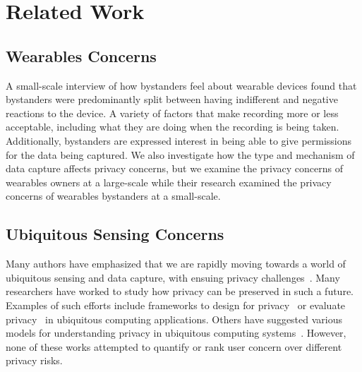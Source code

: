 
\section{Related Work}

\subsection{Wearables Concerns}
A small-scale interview of how bystanders feel about wearable devices \cite{denning2014situ} found that bystanders were predominantly split between having indifferent and negative reactions to the device. A variety of factors that make recording more or less acceptable, including what they are doing when the recording is being taken.  Additionally, bystanders are expressed interest in being able to give permissions for the data being captured. We also investigate how the type and mechanism of data capture affects privacy concerns, but we examine the privacy concerns of wearables owners at a large-scale while their research examined the privacy concerns of wearables bystanders at a small-scale. 

\subsection{Ubiquitous Sensing Concerns}
Many authors have emphasized that we are rapidly moving towards a world of ubiquitous sensing and data capture, with ensuing privacy challenges~\cite{abowd2000charting,palen2003unpacking,camp2000internet}. Many researchers have worked to study how privacy can be preserved in such a future. Examples of such efforts include frameworks to design for privacy~\cite{bellotti1993design,camp2003designing,langheinrich2001privacy} or evaluate privacy~\cite{scholtz2004toward} in ubiquitous computing applications. Others have suggested various models for understanding privacy in ubiquitous computing systems~\cite{hong2004privacy, jiang2002approximate}. However, none of these works attempted to quantify or rank user concern over different privacy risks. 

